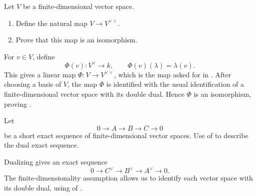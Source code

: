 \documentclass[12pt,a4paper]{article}
\begin{document}
\makesheetheader

\begin{exercise}\label{exercise:basic}
Let \(V\) be a finite-dimensional vector space.
\begin{enumerate}[label=(\alph*), ref=(\alph*)]
  \item \label{item:dual-dual-map} Define the natural map
  \(V \to V^{\vee\vee}\).
  \item \label{item:dual-dual-isomorphism} Prove that this map is an
  isomorphism.
\end{enumerate}
\end{exercise}

\begin{solution}
For \(v \in V\), define
\[
  \Phi(v) \colon V^\vee \to k,
  \qquad
  \Phi(v)(\lambda)=\lambda(v).
\]
This gives a linear map \(\Phi \colon V \to V^{\vee\vee}\), which is the map
asked for in . After choosing a basis of \(V\), the
map \(\Phi\) is identified with the usual identification of a finite-dimensional
vector space with its double dual. Hence \(\Phi\) is an isomorphism, proving
.
\end{solution}

\begin{exercise}\label{exercise:exact-sequence}
Let
\[
  0 \to A \to B \to C \to 0
\]
be a short exact sequence of finite-dimensional vector spaces. Use
 of  to describe the
dual exact sequence.
\end{exercise}

\begin{solution}
Dualizing gives an exact sequence
\[
  0 \to C^\vee \to B^\vee \to A^\vee \to 0.
\]
The finite-dimensionality assumption allows us to identify each vector space
with its double dual, using  of
.
\end{solution}
\end{document}
